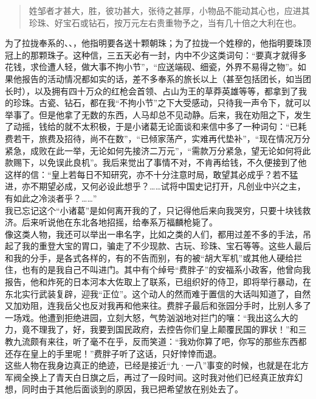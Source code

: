 \begin{quote}
	姓邹者才甚大，胜，彼功甚大，张待之甚厚，小物品不能动其心也，应进其珍珠、好宝石或钻石，按万元左右贵重物予之，当有几十倍之大利在也。\\
\end{quote}

为了拉拢奉系的、、，他指明要各送十颗朝珠；为了拉拢一个姓穆的，他指明要珠顶冠上的那颗珠子。这种信，三五天必有一封，内中不少这类词句：“要真才就得多花钱，求俭遭人轻，做大事不拘小节”，“应送端砚、细瓷，外界不易得之物”。如果他报告的活动情况都如实的话，差不多奉系的旅长以上（甚至包括团长，如当团长时），以及拥有四十万众的红枪会首领、占山为王的草莽英雄等等，都拿到了我的珍珠。古瓷、钻石，都在我“不拘小节”之下大受感动，只待我一声令下，就可以举事了。但是他拿了无数的东西，人马却总不见动静。后来，我在劝阻之下，发生了动摇，钱给的就不太积极，于是小诸葛无论面谈和来信中多了一种词句：“已耗费若干，旅费及招待，尚不在数”，“已倾家荡产，实难再代垫补”，“现在情况万分紧急，成败在此一举，无论如何先接济二万元”，“需款万分紧急，望无论如何将此款赐下，以免误此良机”。我后来觉出了事情不对，不肯再给钱，不久便接到了他这样的信：“皇上若每日不知研究，亦不十分注意时局，敢望其必成乎？若不猛进，亦不期望必成，又何必设此想乎？……试将中国史记打开，凡创业中兴之主，有如此之冷淡者乎？……”\\

我已忘记这个“小诸葛”是如何离开我的了，只记得他后来向我哭穷，只要十块钱救济。后来听说他在东北各地招摇，给奉系万福麟枪毙了。\\

像这类人物，我还可以举出一串名字，比如之类的人们，都用过差不多的手法，吊起了我的重登大宝的胃口，骗走了不少现款、古玩、珍珠、宝石等等。这些人最后和我的分手，是各式各样的，有的不告而别，有的被“胡大军机”或其他人硬给拦住，也有的是我自己不叫进门。其中有个绰号“费胖子”的安福系小政客，他曾向我报告，他和炸死的日本河本大佐取上了联系，已组织好的侍卫，即将举行暴动，在东北实行武装复辟，迎我“正位”。这个动人的然而难于置信的大话叫知道了，自然又加劝阻，连我岳父也反对我再和他来往。费胖子最后和张园分手时，比别人多了一场戏。他遭到拒绝进园，立刻大怒，气势汹汹地对拦门的嚷：“我出这么大的力，竟不理我了，好，我要到国民政府，去控告你们皇上颠覆民国的罪状！”和三教九流颇有来往，听了毫不在乎，反而笑道：“我劝你算了吧，你写的那些东西都还存在皇上的手里呢！”费胖子听了这话，只好悻悻而退。\\

这些人物在我身边真正的绝迹，已经是接近“九·一八”事变的时候，也就是在北方军阀全换上了青天白日旗之后，再过了一段时间。这时我对他们已经真正放弃幻想，同时由于其他后面谈到的原因，我已把希望放在别处去了。
